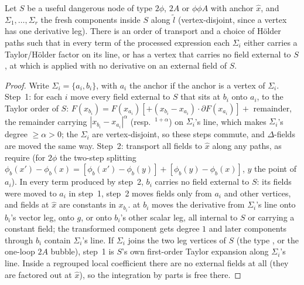 \begin{lemma}\label{lem:a06d:S44}
Let $S$ be a useful dangerous node of type $2\phi$, $2A$ or $\phi\phi A$ with anchor $\hat x$, and $\Sigma_1,\dots,\Sigma_r$ the fresh \cite[(2.4)]{Ba3} components inside $S$ along $\tilde l$ (vertex-disjoint, since a \cite[(1.8)]{Ba3} vertex has one derivative leg). There is an order of transport and a choice of H\"older paths such that in every term of the processed expression each $\Sigma_i$ either carries a Taylor/H\"older factor on its line, or has a vertex that carries no field external to $S$, at which \cite[(2.8)]{Ba3} is applied with no derivative on an external field of $S$.
\end{lemma}

\begin{proof}
Write $\Sigma_i=\{a_i,b_i\}$, with $a_i$ the anchor if the anchor is a vertex of $\Sigma_i$. Step~1: for each $i$ move every field external to $S$ that sits at $b_i$ onto $a_i$, to the Taylor order of $S$: $F(x_{b_i})=F(x_{a_i})[+(x_{b_i}-x_{a_i})\cdot\partial F(x_{a_i})]+$ remainder, the remainder carrying $|x_{b_i}-x_{a_i}|^\alpha$ (resp.\ $^{1+\alpha}$) on $\Sigma_i$'s line, which makes $\Sigma_i$'s degree $\ge\alpha>0$; the $\Sigma_i$ are vertex-disjoint, so these steps commute, and $\Delta$-fields are moved the same way. Step~2: transport all fields to $\hat x$ along any paths, as \cite[(3.19), (3.26), (3.34)]{Ba3} require (for $2\phi$ the two-step splitting $\phi_b(x')-\phi_b(x)=[\phi_b(x')-\phi_b(y)]+[\phi_b(y)-\phi_b(x)]$, $y$ the point of $a_i$). In every term produced by step~2, $b_i$ carries no field external to $S$: its fields were moved to $a_i$ in step~1, step~2 moves fields only from $a_i$ and other vertices, and fields at $\hat x$ are constants in $x_{b_i}$. \cite[(2.8)]{Ba3} at $b_i$ moves the derivative from $\Sigma_i$'s line onto $b_i$'s vector leg, onto $g$, or onto $b_i$'s other scalar leg, all internal to $S$ or carrying a constant field; the transformed component gets degree $1$ and later components through $b_i$ contain $\Sigma_i$'s line. If $\Sigma_i$ joins the two leg vertices of $S$ (the type \cite[(3.8)]{Ba3}, or the one-loop $2A$ bubble), step~1 is $S$'s own first-order Taylor expansion along $\Sigma_i$'s line. Inside a regrouped local coefficient there are no external fields at all (they are factored out at $\hat x$), so the integration by parts is free there.
\end{proof}

